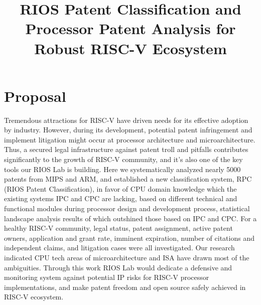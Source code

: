 \documentclass{article}
\title{RIOS Patent Classification and Processor Patent Analysis for Robust RISC-V Ecosystem}
\begin{document}
\maketitle

\section{Proposal}

Tremendous attractions for RISC-V have driven needs for its effective adoption by industry. However, during its development, potential patent infringement and implement litigation might occur at processor architecture and microarchitecture. Thus, a secured legal infrastructure against patent troll and pitfalls contributes significantly to the growth of RISC-V community, and it’s also one of the key tools our RIOS Lab is building. Here we systematically analyzed nearly 5000 patents from MIPS and ARM, and established a new classification system, RPC (RIOS Patent Classification), in favor of CPU domain knowledge which the existing systems IPC and CPC are lacking, based on different technical and functional modules during processor design and development process, statistical landscape analysis results of which outshined those based on IPC and CPC. For a healthy RISC-V community, legal status, patent assignment, active patent owners, application and grant rate, imminent expiration, number of citations and independent claims, and litigation cases were all investigated. Our research indicated CPU tech areas of microarchitecture and ISA have drawn most of the ambiguities. Through this work RIOS Lab would dedicate a defensive and monitoring system against potential IP risks for RISC-V processor implementations, and make patent freedom and open source safely achieved in RISC-V ecosystem.
\end{document}
